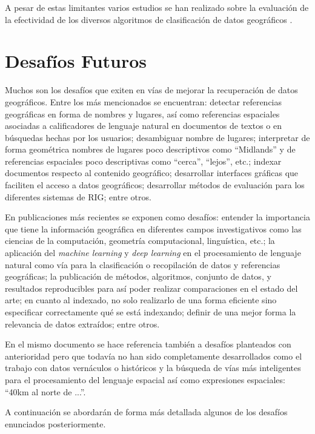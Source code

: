 \documentclass{llncs}
\begin{document}
A pesar de estas limitantes varios estudios se han realizado sobre la evaluación
de la efectividad de los diversos algoritmos de clasificación de datos geográficos
 \cite{larson2004jul,larson2004sep}.

\section{Desafíos Futuros}\label{sec:chall}

Muchos son los desafíos que exiten en vías de mejorar la recuperación de datos
geográficos. Entre los más mencionados \cite{purves2014} se encuentran:
detectar referencias geográficas en forma de nombres y lugares, así como
referencias espaciales asociadas a calificadores de lenguaje natural en
documentos de textos o en búsquedas hechas por los usuarios; desambiguar nombre
de lugares; interpretar de forma geométrica nombres de lugares poco
descriptivos como ``Midlands'' y de referencias espaciales poco descriptivas
como ``cerca'', ``lejos'', etc.; indexar documentos respecto al contenido
geográfico; desarrollar interfaces gráficas que faciliten el acceso a datos
geográficos; desarrollar métodos de evaluación para los diferentes sistemas de
RIG; entre otros.

En publicaciones más recientes \cite{purves2018} se exponen como desafíos:
entender la importancia que tiene la información geográfica en diferentes campos
investigativos como las ciencias de la computación, geometría computacional,
linguística, etc.; la aplicación del \emph{machine learning} y \emph{deep
learning} en el procesamiento de lenguaje natural como vía para la
clasificación o recopilación de datos y referencias geográficas; la publicación
de métodos, algoritmos, conjunto de datos, y resultados reproducibles para así
poder realizar comparaciones en el estado del arte; en cuanto al indexado, no
solo realizarlo de una forma eficiente sino especificar correctamente qué se
está indexando; definir de una mejor forma la relevancia de datos extraídos;
entre otros.

En el mismo documento se hace referencia también a desafíos planteados con
anterioridad pero que todavía no han sido completamente desarrollados como el
trabajo con datos vernáculos o históricos y la búsqueda de vías más
inteligentes para el procesamiento del lenguaje espacial así como expresiones
espaciales: ``40km al norte de ...''.

A continuación se abordarán de forma más detallada algunos de los
desafíos enunciados posteriormente.
\end{document}
